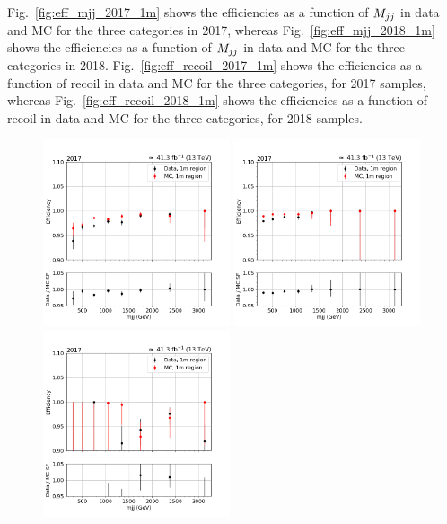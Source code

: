 Fig.~\ref{fig:eff_mjj_2017_1m} shows the efficiencies as a function of $M_{jj}$ in data and MC for the three categories in 2017, 
whereas Fig.~\ref{fig:eff_mjj_2018_1m} shows the efficiencies as a function of $M_{jj}$ in data and MC for the three categories in 2018. 
Fig.~\ref{fig:eff_recoil_2017_1m} shows the efficiencies as a function of recoil in data and MC for the three categories, 
for 2017 samples, whereas Fig.~\ref{fig:eff_recoil_2018_1m} shows the efficiencies as a function of recoil in data and MC 
for the three categories, for 2018 samples. 

\begin{figure}[htp]
    \begin{center}
        \includegraphics[width=0.49\textwidth]{fig/efficiency/trigger/met/mjj/data_mc_comparison_1m_2017_one_jet_forward_one_jet_central.png}
        \includegraphics[width=0.49\textwidth]{fig/efficiency/trigger/met/mjj/data_mc_comparison_1m_2017_two_central_jets.png} \\
        \includegraphics[width=0.49\textwidth]{fig/efficiency/trigger/met/mjj/data_mc_comparison_1m_2017_two_forward_jets.png}

\end{center}
\end{figure}
